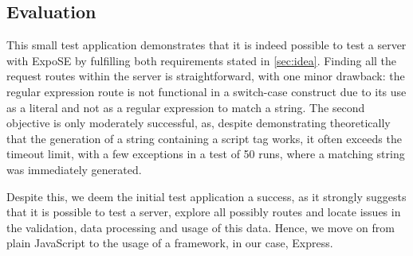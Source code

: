 \subsection{Evaluation}
This small test application demonstrates that it is indeed possible to test a server with ExpoSE by fulfilling both requirements stated in \autoref{sec:idea}. Finding all the request routes within the server is straightforward, with one minor drawback: the regular expression route is not functional in a switch-case construct due to its use as a literal and not as a regular expression to match a string. 
The second objective is only moderately successful, as, despite demonstrating theoretically that the generation of a string containing a script tag works, it often exceeds the timeout limit, with a few exceptions in a test of 50 runs, where a matching string was immediately generated.

Despite this, we deem the initial test application a success, as it strongly suggests that it is possible to test a server, explore all possibly routes and locate issues in the validation, data processing and usage of this data. Hence, we move on from plain JavaScript to the usage of a framework, in our case, Express.
